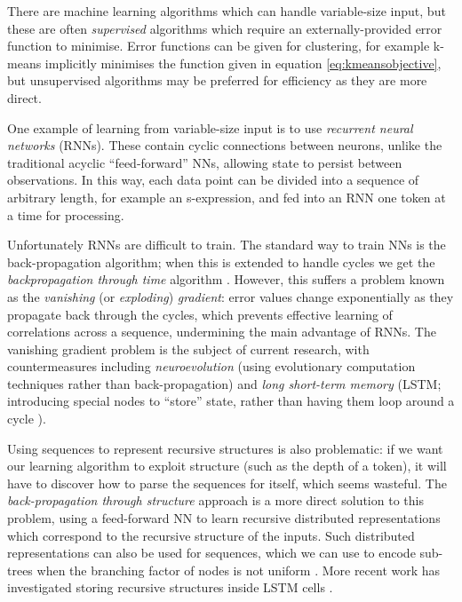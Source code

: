 There are machine learning algorithms which can handle variable-size input, but
these are often \emph{supervised} algorithms which require an
externally-provided error function to minimise. Error functions can be given for
clustering, for example k-means implicitly minimises the function given in
equation \ref{eq:kmeansobjective}, but unsupervised algorithms may be preferred
for efficiency as they are more direct.

One example of learning from variable-size input is to use \emph{recurrent
  neural networks} (RNNs). These contain cyclic connections between neurons,
unlike the traditional acyclic ``feed-forward'' NNs, allowing state to persist
between observations. In this way, each data point can be divided into a
sequence of arbitrary length, for example an s-expression, and fed into an RNN
one token at a time for processing.

Unfortunately RNNs are difficult to train. The standard way to train NNs is the
back-propagation algorithm; when this is extended to handle cycles we get the
\emph{backpropagation through time} algorithm
\cite{werbos1990backpropagation}. However, this suffers a problem known as the
\emph{vanishing} (or \emph{exploding}) \emph{gradient}: error values change
exponentially as they propagate back through the cycles, which prevents
effective learning of correlations across a sequence, undermining the main
advantage of RNNs. The vanishing gradient problem is the subject of current
research, with countermeasures including \emph{neuroevolution} (using
evolutionary computation techniques rather than back-propagation) and \emph{long
  short-term memory} (LSTM; introducing special nodes to ``store'' state, rather
than having them loop around a cycle \cite{hochreiter1997long}).

Using sequences to represent recursive structures is also problematic: if we
want our learning algorithm to exploit structure (such as the depth of a token),
it will have to discover how to parse the sequences for itself, which seems
wasteful. The \emph{back-propagation through structure} approach
\cite{goller1996learning} is a more direct solution to this problem, using a
feed-forward NN to learn recursive distributed representations
\cite{pollack1990recursive} which correspond to the recursive structure of the
inputs. Such distributed representations can also be used for sequences, which
we can use to encode sub-trees when the branching factor of nodes is not uniform
\cite{kwasny1995tail}. More recent work has investigated storing recursive
structures inside LSTM cells \cite{zhu2015long}.

